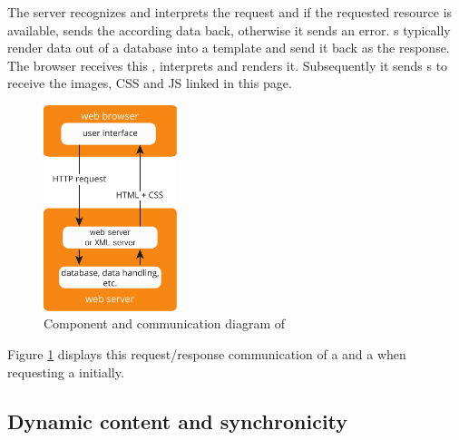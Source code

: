 \noindent{}The server recognizes and interprets the request and if the requested resource is available, sends the according data back, otherwise it sends an error.
\WebApplication{}s typically render data out of a database into a \html{} template and send it back as the response.
The browser receives this \webPage{}, interprets and renders it.
Subsequently it sends \httpRequest{}s to receive the images, CSS and JS linked in this page.

\begin{figure}[H]
\centering
\includegraphics[height=6cm]{images/http.pdf}
\caption[http_components]{Component and communication diagram of \http{}}
\label{fig:http_components}
\end{figure}

\noindent{}Figure \ref{fig:http_components} displays this request/response communication of a \webBrowser{} and a \webServer{} when requesting a \webPage{} initially.

\subsection{Dynamic content and synchronicity\label{synchronicity}}

